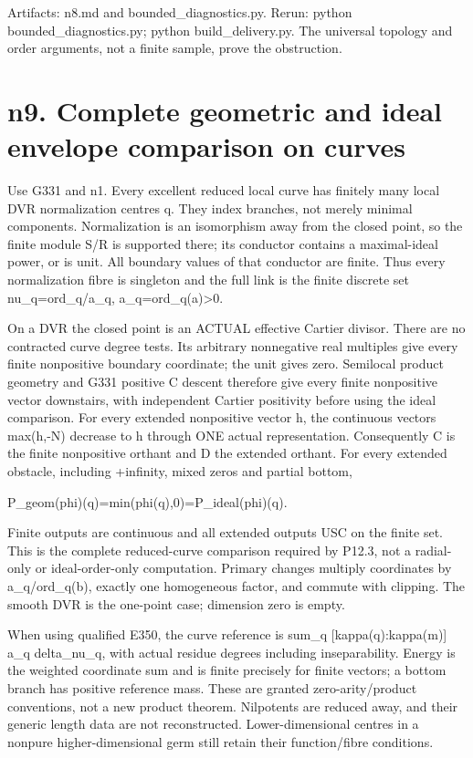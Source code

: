 \documentclass[11pt]{article}
\begin{document}
Artifacts: n8.md and bounded\_diagnostics.py. Rerun: python bounded\_diagnostics.py; python build\_delivery.py. The universal topology and order arguments, not a finite sample, prove the obstruction.


\section*{n9. Complete geometric and ideal envelope comparison on curves}

Use G331 and n1. Every excellent reduced local curve has finitely many local DVR normalization centres q. They index branches, not merely minimal components. Normalization is an isomorphism away from the closed point, so the finite module S/R is supported there; its conductor contains a maximal-ideal power, or is unit. All boundary values of that conductor are finite. Thus every normalization fibre is singleton and the full link is the finite discrete set nu\_q=ord\_q/a\_q, a\_q=ord\_q(a)>0.

On a DVR the closed point is an ACTUAL effective Cartier divisor. There are no contracted curve degree tests. Its arbitrary nonnegative real multiples give every finite nonpositive boundary coordinate; the unit gives zero. Semilocal product geometry and G331 positive C descent therefore give every finite nonpositive vector downstairs, with independent Cartier positivity before using the ideal comparison. For every extended nonpositive vector h, the continuous vectors max(h,-N) decrease to h through ONE actual representation. Consequently C is the finite nonpositive orthant and D the extended orthant. For every extended obstacle, including +infinity, mixed zeros and partial bottom,

    P\_geom(phi)(q)=min(phi(q),0)=P\_ideal(phi)(q).

Finite outputs are continuous and all extended outputs USC on the finite set. This is the complete reduced-curve comparison required by P12.3, not a radial-only or ideal-order-only computation. Primary changes multiply coordinates by a\_q/ord\_q(b), exactly one homogeneous factor, and commute with clipping. The smooth DVR is the one-point case; dimension zero is empty.

When using qualified E350, the curve reference is sum\_q [kappa(q):kappa(m)] a\_q delta\_nu\_q, with actual residue degrees including inseparability. Energy is the weighted coordinate sum and is finite precisely for finite vectors; a bottom branch has positive reference mass. These are granted zero-arity/product conventions, not a new product theorem. Nilpotents are reduced away, and their generic length data are not reconstructed. Lower-dimensional centres in a nonpure higher-dimensional germ still retain their function/fibre conditions.
\end{document}
